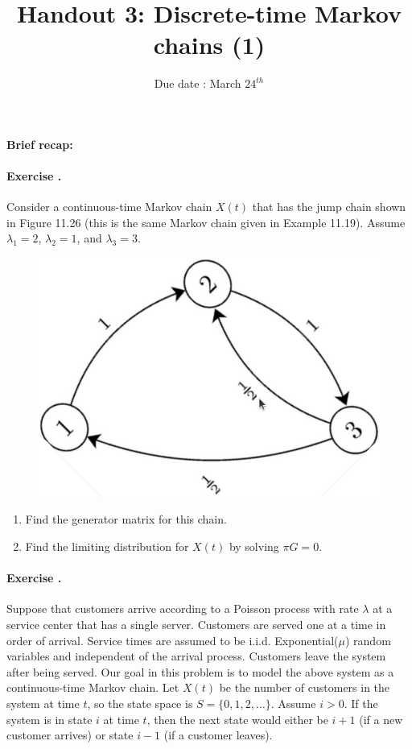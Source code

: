 \documentclass[twocolumn,12pt,a4paper]{article}
\title{ \bfseries \Huge {Handout 3: Discrete-time Markov chains (1) }}
\date{Due date : March $24^{th}$}
\newcounter{num}  %
\begin{document}
	\maketitle
	\setcounter{num}{1}  %
	
	\thispagestyle{empty} 
	\paragraph{Brief recap:}
	
	
	\paragraph{Exercise \thenum.}
	Consider a continuous-time Markov chain \( X(t) \) that has the jump chain shown in Figure 11.26 (this is the same Markov chain given in Example 11.19). Assume \( \lambda_1 = 2 \), \( \lambda_2 = 1 \), and \( \lambda_3 = 3 \).
	\vspace{-.5cm}  
		\begin{figure}[h!]
		\begin{center}
		\includegraphics[width = .3\textwidth]{images/ctmc_1.png}
		\end{center}
	\end{figure}
	\vspace{-1cm}        
	\begin{enumerate}
		\item Find the generator matrix for this chain.
		\item Find the limiting distribution for \( X(t) \) by solving \( \pi G = 0 \).
	\end{enumerate}
	
	
	\paragraph{Exercise \thenum.}
	Suppose that customers arrive according to a Poisson process with rate \( \lambda \) at a service center that has a single server. Customers are served one at a time in order of arrival. Service times are assumed to be i.i.d. Exponential(\( \mu \)) random variables and independent of the arrival process. Customers leave the system after being served. Our goal in this problem is to model the above system as a continuous-time Markov chain. Let \( X(t) \) be the number of customers in the system at time \( t \), so the state space is \( S = \{0, 1, 2, \dots\} \). Assume \( i > 0 \). If the system is in state \( i \) at time \( t \), then the next state would either be \( i + 1 \) (if a new customer arrives) or state \( i - 1 \) (if a customer leaves).
	
\end{document}
